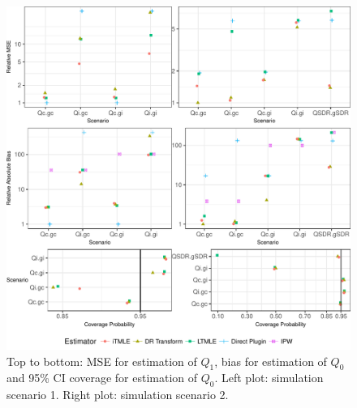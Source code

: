 \documentclass{article}\usepackage[]{graphicx}\usepackage[]{color}
\makeatletter
\def\maxwidth{ %
  \ifdim\Gin@nat@width>\linewidth
    \linewidth
  \else
    \Gin@nat@width
  \fi
}
\newenvironment{knitrout}{}{} %
\makeatother
\begin{document}
\clearpage
\begin{knitrout}
\color{fgcolor}\begin{figure}

{\centering \includegraphics[width=\maxwidth]{figure/plot-ggplot_all-1} 

}

\caption[Top to bottom]{Top to bottom: MSE for estimation of $Q_1$, bias for estimation of $Q_0$ and 95\% CI coverage for estimation of $Q_0$. Left plot: simulation scenario 1. Right plot: simulation scenario 2.}\label{fig:ggplot.all}
\end{figure}


\end{knitrout}
\end{document}
